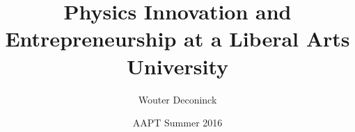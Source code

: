 \documentclass[xcolor=table,compress,professionalfonts,pdfpagelabels]{beamer}
\title{Physics Innovation and Entrepreneurship at a Liberal Arts University}
\author{Wouter Deconinck}
\institute{William \& Mary}
\date{AAPT Summer 2016}
\begin{document}
%


\begin{frame}[plain]
 \maketitle
\end{frame}
\end{document}
